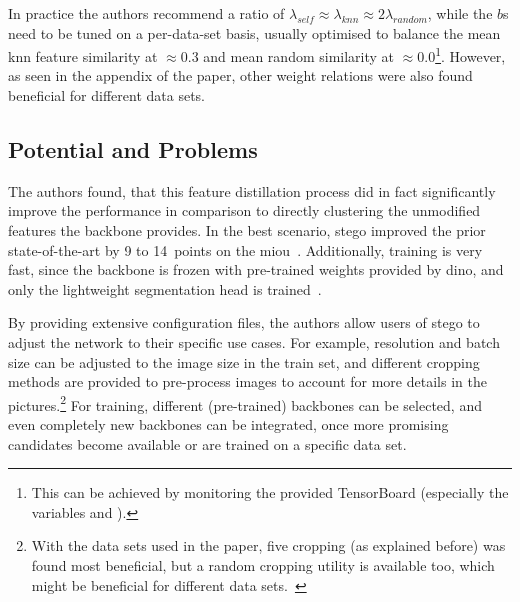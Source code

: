 In practice the authors recommend a ratio of $\lambda_{self} \approx \lambda_{knn} \approx 2 \lambda_{random}$, while the $b$s need to be tuned on a per-data-set basis, usually optimised to balance the mean knn feature similarity at $\approx 0.3$ and mean random similarity at $\approx 0.0$\footnote{This can be achieved by monitoring the provided TensorBoard (especially the variables \posinter and \neginter).}. %
However, as seen in the appendix of the paper, other weight relations were also found beneficial for different data sets.~\autocite{Hamilton2022}

\subsection{Potential and Problems}

The authors found, that this feature distillation process did in fact significantly improve the performance in comparison to directly clustering the unmodified features the backbone provides.
In the best scenario, \gls{stego} improved the prior state-of-the-art by 9 to 14~points on the \gls{miou}~\autocite{Hamilton2022}.
Additionally, training is very fast, since the backbone is frozen with pre-trained weights provided by \gls{dino}, and only the lightweight segmentation head is trained~\autocite{Hamilton2022}.

By providing extensive configuration files, the authors allow users of \gls{stego} to adjust the network to their specific use cases.
For example, resolution and batch size can be adjusted to the image size in the train set, and different cropping methods are provided to pre-process images to account for more details in the pictures.\footnote{With the data sets used in the paper, five cropping (as explained before) was found most beneficial, but a random cropping utility is available too, which might be beneficial for different data sets.~\autocite{Ji2019}}
For training, different (pre-trained) backbones can be selected, and even completely new backbones can be integrated, once more promising candidates become available or are trained on a specific data set.~\autocite{Hamilton2022}

